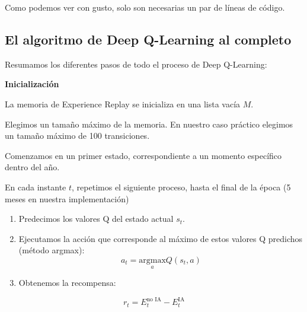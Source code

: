 \documentclass[
]{book}
\providecommand{\tightlist}{%
  \setlength{\itemsep}{0pt}\setlength{\parskip}{0pt}}
\begin{document}
Como podemos ver con gusto, solo son necesarias un par de líneas de código.

\hypertarget{el-algoritmo-de-deep-q-learning-al-completo}{%
\subsection{El algoritmo de Deep Q-Learning al completo}\label{el-algoritmo-de-deep-q-learning-al-completo}}

Resumamos los diferentes pasos de todo el proceso de Deep Q-Learning:

\textbf{Inicialización}

La memoria de Experience Replay se inicializa en una lista vacía \(M\).

Elegimos un tamaño máximo de la memoria. En nuestro caso práctico elegimos un tamaño máximo de 100 transiciones.

Comenzamos en un primer estado, correspondiente a un momento específico dentro del año.

En cada instante \(t\), repetimos el siguiente proceso, hasta el final de la época (5 meses en nuestra implementación)

\begin{enumerate}
\def\labelenumi{\arabic{enumi}.}
\tightlist
\item
  Predecimos los valores Q del estado actual \(s_t\).
\item
  Ejecutamos la acción que corresponde al máximo de estos valores Q predichos (método argmax):
  \[a_t = \underset{a}{\textrm{argmax}} Q(s_t, a)\]
\item
  Obtenemos la recompensa:
\end{enumerate}

\[r_t = E_t^{\textrm{no IA}} - E_t^{\textrm{IA}}\]
\end{document}
